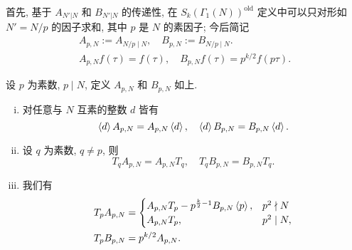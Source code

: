 首先, 基于 $A_{N'|N}$ 和 $B_{N'|N}$ 的传递性, 在 $S_k(\Gamma_1(N))^{\mathrm{old}}$ 定义中可以只对形如 $N' = N/p$ 的因子求和, 其中 $p$ 是 $N$ 的素因子; 今后简记
\begin{gather*}
	A_{p,N} := A_{N/p \mid N}, \quad B_{p,N} := B_{N/p \mid N}. \\
	A_{p,N}f(\tau) = f(\tau), \quad B_{p,N}f(\tau) = p^{k/2} f(p\tau).
\end{gather*}

\begin{lemma}\label{prop:oldform-invariance}
	设 $p$ 为素数, $p \mid N$, 定义 $A_{p, N}$ 和 $B_{p, N}$ 如上.
	\begin{enumerate}[(i)]
		\item 对任意与 $N$ 互素的整数 $d$ 皆有
		\[ \left\langle d \right\rangle A_{p, N} = A_{p, N} \left\langle d \right\rangle, \quad \left\langle d \right\rangle B_{p, N} = B_{p, N} \left\langle d \right\rangle. \]
		\item 设 $q$ 为素数, $q \neq p$, 则
		\[ T_q A_{p, N} = A_{p, N} T_q, \quad T_q B_{p, N} = B_{p, N} T_q. \]
		\item 我们有
		\begin{equation*}\begin{aligned}
			T_p A_{p, N} & = \begin{cases}
				A_{p, N} T_p - p^{\frac{k}{2} - 1} B_{p, N} \left\langle p \right\rangle, & p^2 \nmid N \\
				A_{p, N} T_p, & p^2 \mid N,
			\end{cases} \\
			T_p B_{p, N} & = p^{k/2} A_{p, N}.
		\end{aligned}\end{equation*}
	\end{enumerate}
\end{lemma}
